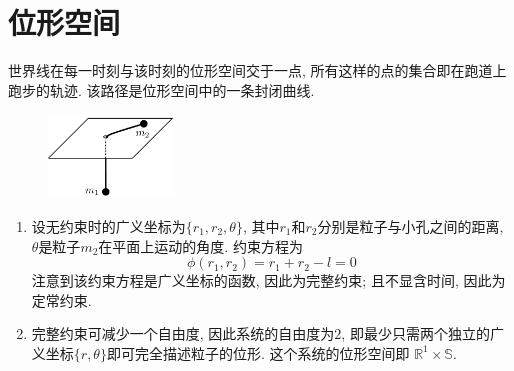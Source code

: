 \chapter{位形空间}
\begin{solution}
    世界线在每一时刻与该时刻的位形空间交于一点, 所有这样的点的集合即在跑道上跑步的轨迹. 该路径是位形空间中的一条封闭曲线.
\end{solution}

\begin{figure}[h]
    \centering
    \includegraphics[width=0.3\textwidth]{content/Figures/2-2}
    \caption{ }
    \label{fig:2-2}
\end{figure}
\begin{solution}\label{problem2-2}
    \begin{enumerate}[label=(\arabic*)]
        \item 设无约束时的广义坐标为$\{r_1, r_2, \theta\}$, 其中$r_1$和$r_2$分别是粒子与小孔之间的距离, $\theta$是粒子$m_2$在平面上运动的角度.
        约束方程为\[
            \phi (r_1, r_2) = r_1 + r_2 - l = 0
        \]
        注意到该约束方程是广义坐标的函数, 因此为完整约束; 且不显含时间, 因此为定常约束.
        \item 完整约束可减少一个自由度, 因此系统的自由度为$2$, 即最少只需两个独立的广义坐标$\{r, \theta\}$即可完全描述粒子的位形. 这个系统的位形空间即 $\mathbb{R}^1 \times \mathbb{S}$.
    \end{enumerate}
\end{solution}

